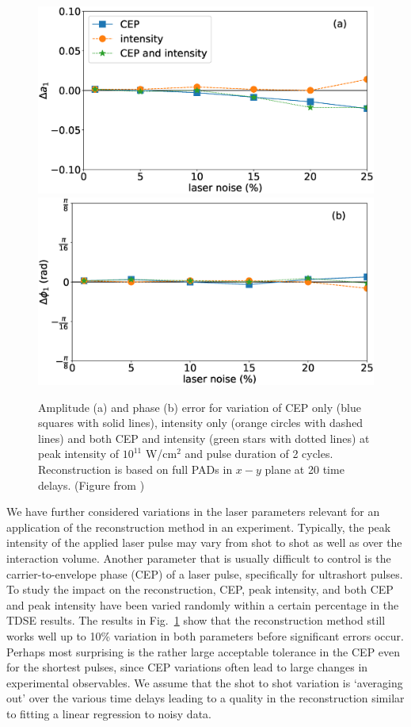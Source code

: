 \begin{figure}[!ht]
\centering
\includegraphics[width=0.49\linewidth]{figs/Photo_ionization/superpositions/Venzke_new_fig_9a.eps}
\includegraphics[width=0.49\linewidth]{figs/Photo_ionization/superpositions/Venzke_new_fig_9b.eps}
\caption{
Amplitude (a) and phase (b) error for variation of CEP only (blue squares with solid lines), intensity only (orange circles with dashed lines) and both CEP and intensity (green stars with dotted lines)
at peak intensity of  $10^{11}$ W/cm$^2$ and pulse duration of 2 cycles.  Reconstruction is based on full PADs in $x-y$ plane at 20 time delays. (Figure from \cite{venzke2021_wave})
} 
  \label{fig:noise}
\end{figure}

We have further considered variations in the laser parameters relevant for an application of the reconstruction method in an experiment. Typically, the peak intensity of the applied laser pulse may vary from shot to shot as well as over the interaction volume. Another parameter that is usually difficult to control is the carrier-to-envelope phase (CEP) of a laser pulse, specifically for ultrashort pulses. To study the impact on the reconstruction, CEP, peak intensity, and both CEP and peak intensity have been varied randomly within a certain percentage in the TDSE results. The results in Fig.~\ref{fig:noise} show that the reconstruction method still works well up to 10\% variation in both parameters before significant errors occur. Perhaps most surprising is the rather large acceptable tolerance in the CEP even for the shortest pulses, since CEP variations often lead to large changes in experimental observables. We assume that the shot to shot variation is `averaging out' over the various time delays leading to a quality in the reconstruction similar to fitting a linear regression to noisy data.

